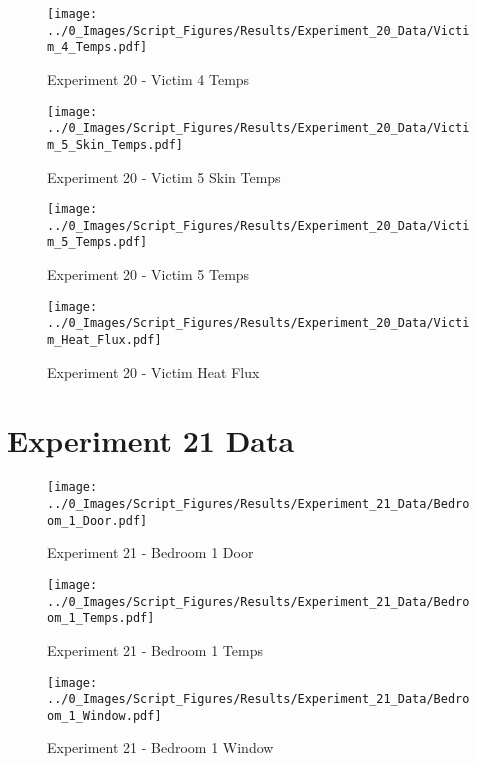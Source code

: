 	\begin{figure}[H]
		\centering
		\texttt{[image: ../0\_Images/Script\_Figures/Results/Experiment\_20\_Data/Victim\_4\_Temps.pdf]}
		\caption[]{Experiment 20 - Victim 4 Temps}
	\end{figure}
 
	\clearpage

	\begin{figure}[H]
		\centering
		\texttt{[image: ../0\_Images/Script\_Figures/Results/Experiment\_20\_Data/Victim\_5\_Skin\_Temps.pdf]}
		\caption[]{Experiment 20 - Victim 5 Skin Temps}
	\end{figure}
 

	\begin{figure}[H]
		\centering
		\texttt{[image: ../0\_Images/Script\_Figures/Results/Experiment\_20\_Data/Victim\_5\_Temps.pdf]}
		\caption[]{Experiment 20 - Victim 5 Temps}
	\end{figure}
 
	\clearpage

	\begin{figure}[H]
		\centering
		\texttt{[image: ../0\_Images/Script\_Figures/Results/Experiment\_20\_Data/Victim\_Heat\_Flux.pdf]}
		\caption[]{Experiment 20 - Victim Heat Flux}
	\end{figure}
 

\clearpage		\large
\section{Experiment 21 Data} \label{App:Exp21Results} 

	\begin{figure}[H]
		\centering
		\texttt{[image: ../0\_Images/Script\_Figures/Results/Experiment\_21\_Data/Bedroom\_1\_Door.pdf]}
		\caption[]{Experiment 21 - Bedroom 1 Door}
	\end{figure}
 

	\begin{figure}[H]
		\centering
		\texttt{[image: ../0\_Images/Script\_Figures/Results/Experiment\_21\_Data/Bedroom\_1\_Temps.pdf]}
		\caption[]{Experiment 21 - Bedroom 1 Temps}
	\end{figure}
 
	\clearpage

	\begin{figure}[H]
		\centering
		\texttt{[image: ../0\_Images/Script\_Figures/Results/Experiment\_21\_Data/Bedroom\_1\_Window.pdf]}
		\caption[]{Experiment 21 - Bedroom 1 Window}
	\end{figure}
 

